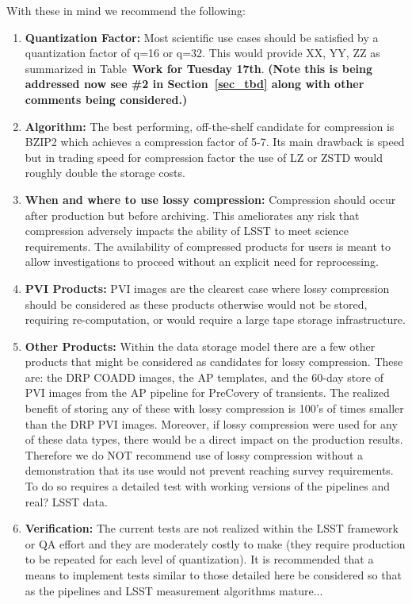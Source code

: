 With these in mind we recommend the following:
\begin{enumerate}
\item {\bf Quantization Factor:} Most scientific use cases should be satisfied by a quantization factor of q=16 or q=32.  This would provide XX, YY, ZZ as summarized in Table~{\bf Work for Tuesday 17th}. {\bf (Note this is being addressed now see \#2 in Section~\ref{sec_tbd} along with other comments being considered.)}

\item {\bf Algorithm:} The best performing, off-the-shelf candidate for compression is BZIP2 which achieves a compression factor of 5-7.  Its main drawback is speed but in trading speed for compression factor the use of LZ or ZSTD would roughly double the storage costs. 

\item {\bf When and where to use lossy compression:}  Compression should occur after production but before archiving. 
This ameliorates any risk that compression adversely impacts the ability of LSST to meet science requirements.  The availability of compressed products for
users is meant to allow investigations to proceed without an explicit need for reprocessing.  

\item {\bf PVI Products:} PVI images are the clearest case where lossy compression should be considered as these products otherwise would not be stored, requiring re-computation, or would require a large tape storage infrastructure. 

\item {\bf Other Products:} Within the data storage model there are a few other products that might be considered as candidates for lossy compression.  These are: the DRP COADD images, the AP templates, and the 60-day store of PVI images from the AP pipeline for PreCovery of transients.  The realized benefit of storing any of these with lossy compression is 100's of times smaller than the DRP PVI images.  Moreover, if lossy compression were used for any of these data types, there would be a direct impact on the production results.  Therefore we do NOT recommend use of lossy compression without a demonstration that its use would not prevent reaching survey requirements.  To do so requires a detailed test with working versions of the pipelines and real? LSST data. 

\item {\bf Verification:} The current tests are not realized within the LSST framework or QA effort and they are moderately costly to make (they require production to be repeated for each level of quantization).  It is recommended that a means to implement tests similar to those detailed here be considered so that as the pipelines and LSST measurement algorithms mature...

\end{enumerate}


